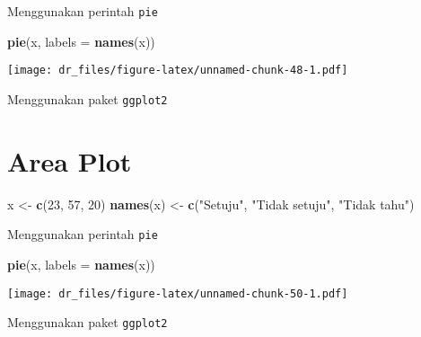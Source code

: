 \documentclass[
]{book}
\newenvironment{Shaded}{\begin{snugshade}}{\end{snugshade}}
\newcommand{\DataTypeTok}[1]{\textcolor[rgb]{0.13,0.29,0.53}{#1}}
\newcommand{\DecValTok}[1]{\textcolor[rgb]{0.00,0.00,0.81}{#1}}
\newcommand{\KeywordTok}[1]{\textcolor[rgb]{0.13,0.29,0.53}{\textbf{#1}}}
\newcommand{\NormalTok}[1]{#1}
\newcommand{\StringTok}[1]{\textcolor[rgb]{0.31,0.60,0.02}{#1}}
\begin{document}
Menggunakan perintah \texttt{pie}

\begin{Shaded}
\begin{Highlighting}[]
\KeywordTok{pie}\NormalTok{(x, }\DataTypeTok{labels =} \KeywordTok{names}\NormalTok{(x))}
\end{Highlighting}
\end{Shaded}

\texttt{[image: dr\_files/figure-latex/unnamed-chunk-48-1.pdf]}

Menggunakan paket \texttt{ggplot2}

\hypertarget{area-plot}{%
\section{Area Plot}\label{area-plot}}

\begin{Shaded}
\begin{Highlighting}[]
\NormalTok{x <-}\StringTok{ }\KeywordTok{c}\NormalTok{(}\DecValTok{23}\NormalTok{, }\DecValTok{57}\NormalTok{, }\DecValTok{20}\NormalTok{)}
\KeywordTok{names}\NormalTok{(x) <-}\StringTok{ }\KeywordTok{c}\NormalTok{(}\StringTok{"Setuju"}\NormalTok{, }\StringTok{"Tidak setuju"}\NormalTok{, }\StringTok{"Tidak tahu"}\NormalTok{)}
\end{Highlighting}
\end{Shaded}

Menggunakan perintah \texttt{pie}

\begin{Shaded}
\begin{Highlighting}[]
\KeywordTok{pie}\NormalTok{(x, }\DataTypeTok{labels =} \KeywordTok{names}\NormalTok{(x))}
\end{Highlighting}
\end{Shaded}

\texttt{[image: dr\_files/figure-latex/unnamed-chunk-50-1.pdf]}

Menggunakan paket \texttt{ggplot2}

  
\end{document}
